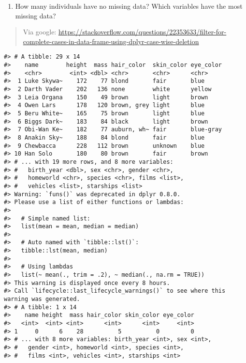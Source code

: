 \documentclass[
]{book}
\providecommand{\tightlist}{%
  \setlength{\itemsep}{0pt}\setlength{\parskip}{0pt}}
\begin{document}
\begin{enumerate}
\def\labelenumi{\arabic{enumi}.}
\setcounter{enumi}{9}
\tightlist
\item
  How many individuals have no missing data? Which variables have the most missing data?
\end{enumerate}

\begin{quote}
Via google: \url{https://stackoverflow.com/questions/22353633/filter-for-complete-cases-in-data-frame-using-dplyr-case-wise-deletion}
\end{quote}

\begin{verbatim}
#> # A tibble: 29 x 14
#>    name        height  mass hair_color  skin_color eye_color
#>    <chr>        <int> <dbl> <chr>       <chr>      <chr>    
#>  1 Luke Skywa~    172    77 blond       fair       blue     
#>  2 Darth Vader    202   136 none        white      yellow   
#>  3 Leia Organa    150    49 brown       light      brown    
#>  4 Owen Lars      178   120 brown, grey light      blue     
#>  5 Beru White~    165    75 brown       light      blue     
#>  6 Biggs Dark~    183    84 black       light      brown    
#>  7 Obi-Wan Ke~    182    77 auburn, wh~ fair       blue-gray
#>  8 Anakin Sky~    188    84 blond       fair       blue     
#>  9 Chewbacca      228   112 brown       unknown    blue     
#> 10 Han Solo       180    80 brown       fair       brown    
#> # ... with 19 more rows, and 8 more variables:
#> #   birth_year <dbl>, sex <chr>, gender <chr>,
#> #   homeworld <chr>, species <chr>, films <list>,
#> #   vehicles <list>, starships <list>
#> Warning: `funs()` was deprecated in dplyr 0.8.0.
#> Please use a list of either functions or lambdas: 
#> 
#>   # Simple named list: 
#>   list(mean = mean, median = median)
#> 
#>   # Auto named with `tibble::lst()`: 
#>   tibble::lst(mean, median)
#> 
#>   # Using lambdas
#>   list(~ mean(., trim = .2), ~ median(., na.rm = TRUE))
#> This warning is displayed once every 8 hours.
#> Call `lifecycle::last_lifecycle_warnings()` to see where this warning was generated.
#> # A tibble: 1 x 14
#>    name height  mass hair_color skin_color eye_color
#>   <int>  <int> <int>      <int>      <int>     <int>
#> 1     0      6    28          5          0         0
#> # ... with 8 more variables: birth_year <int>, sex <int>,
#> #   gender <int>, homeworld <int>, species <int>,
#> #   films <int>, vehicles <int>, starships <int>
\end{verbatim}
\end{document}
